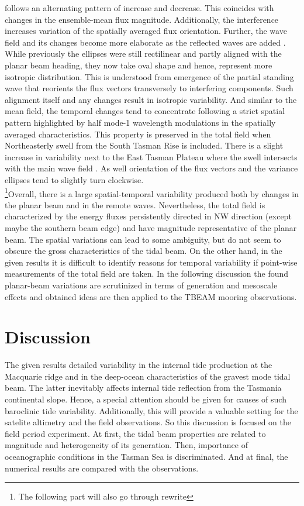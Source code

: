 \documentclass[12pt]{article}
\begin{document}
follows an alternating pattern of increase and decrease. This coincides with changes in the 
ensemble-mean flux magnitude. Additionally, the interference increases variation of the spatially 
averaged flux orientation. Further, the wave field and its changes 
become more elaborate as the reflected waves are added . While 
previously the ellipses were still rectilinear and partly aligned with the planar beam heading, 
they now take oval shape and hence, represent more isotropic distribution. This is understood 
from emergence of the partial standing wave that reorients the flux vectors transversely to 
interfering components. Such alignment itself and any changes result in isotropic 
variability. And similar to the mean field, the temporal changes tend to concentrate 
following a strict spatial pattern highlighted by half mode-1 wavelength modulations in the 
spatially averaged 
characteristics. This property is preserved in the total field when Northeasterly swell from the 
South 
Tasman Rise is included. There is a slight increase in variability next to the East Tasman Plateau 
where the swell intersects with the main wave field . As well 
orientation of the flux vectors and the variance ellipses tend to slightly turn clockwise.\\

\footnote{The following part will also go through rewrite}Overall, 
there is a large spatial-temporal variability produced both by changes in the planar beam and in 
the remote waves. Nevertheless, the total field is characterized by the energy fluxes persistently 
directed in NW direction (except maybe the southern beam edge) and have magnitude representative of 
the planar beam. The spatial variations can lead to some ambiguity, but do not seem to obscure the 
gross characteristics of the tidal beam. On the other hand, in the given results it is difficult to 
identify reasons for temporal variability if point-wise measurements of the total field are taken. 
In the following discussion the found planar-beam variations are scrutinized in terms of generation 
and mesoscale effects and obtained ideas are then applied to the TBEAM mooring observations. 

\newpage
\section{Discussion}
The given results detailed variability in the internal tide production at the Macquarie ridge 
and in the deep-ocean characteristics of the gravest mode tidal beam. The latter inevitably 
affects internal tide reflection from the Tasmania continental slope. Hence, a special attention 
should be given for causes of such baroclinic tide variability. Additionally, this will provide a 
valuable setting for the satelite altimetry and the field observations. So this discussion is 
focused on the field period experiment. At first, the tidal beam properties are related to 
magnitude and heterogeneity of its generation. Then, importance of oceanographic conditions in the 
Tasman Sea is discriminated. And at final, the numerical results are compared with the observations.
\end{document}
